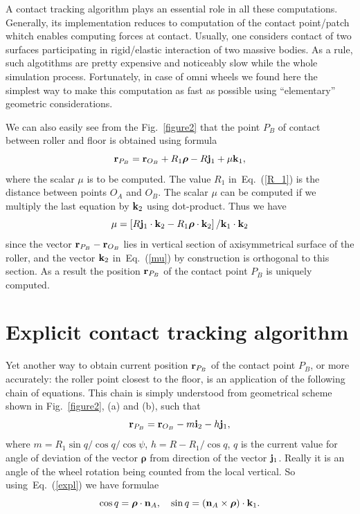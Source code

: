 \documentclass{jsme-tj}
\begin{document}
A contact tracking algorithm plays an essential role in all these computations.
Generally, its implementation reduces to computation of the contact point/patch
whitch enables computing forces at contact. Usually, one considers contact of 
two surfaces participating in rigid/elastic interaction of two massive bodies. 
As a rule, such algotithms are pretty expensive and noticeably slow while the 
whole simulation process. Fortunately, in case of omni wheels we found here the 
simplest way to make this computation as fast as possible using ``elementary'' 
geometric considerations.

We can also easily see from the Fig.~\ref{figure2} that the point $P_B$ of 
contact between roller and floor is obtained using formula
\begin{equation}
{\bf r}_{P_B}={\bf r}_{O_B}+R_1\bm\rho -R{\bf j}_1+\mu {\bf k}_1,\label{R_1}
\end{equation}
where the scalar $\mu $ is to be computed. The value $R_1$ in~Eq.~(\ref{R_1}) 
is the distance between points $O_A$ and $O_B$. The scalar $\mu $ can be 
computed if we multiply the last equation by ${\bf k}_2$ using dot-product. 
Thus we have
\begin{equation}
\mu =\left[R{\bf j}_1\cdot{\bf k}_2-R_1{\bm\rho }\cdot {\bf k}_2\right] /
{\bf k}_1\cdot{\bf k}_2
\label{mu}
\end{equation}
since the vector ${\bf r}_{P_B}-{\bf r}_{O_B}$ lies in vertical section of
axisymmetrical surface of the roller, and the vector ${\bf k}_2$ 
in~Eq.~(\ref{mu}) by construction is orthogonal to this section. As a result 
the position ${\bf r}_{P_B}$ of the contact point $P_B$ is uniquely computed.

\section{Explicit contact tracking algorithm}

Yet another way to obtain current position ${\bf r}_{P_B}$ of the contact point
$P_B$, or more accurately: the roller point closest to the floor, is an 
application of the following chain of equations. This chain is simply
understood from geometrical scheme shown in Fig.~\ref{figure2}, (a) and (b),
such that
\begin{equation}
{\bf r}_{P_B}={\bf r}_{O_B}-m{\bf i}_2-h{\bf j}_1,
\label{expl}
\end{equation}
where $m=R_1\sin q/\cos q/\cos\psi $, $h=R-R_1/\cos q$, $q$ is the current 
value for angle of deviation of the vector $\bm\rho$ from direction of the 
vector ${\bf j}_1$. Really it is an angle of the wheel rotation being counted
from the local vertical. So using~Eq.~(\ref{expl}) we have formulae
\begin{equation}
\cos q=\bm\rho\cdot{\bf n}_A,\quad\sin q=
\left({\bf n}_A\times\bm\rho\right)\cdot {\bf k}_1.
\label{q}
\end{equation}
\end{document}
